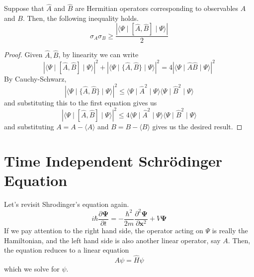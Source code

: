 \documentclass{article}
\begin{document}
    \begin{theorem}
      \label{thm:heisenberg-uncertainty-principle}
      Suppose that $\hat{A}$ and $\hat{B}$ are Hermitian operators corresponding to observables $A$ and $B$. Then, the following inequality holds. 
      \begin{equation} 
        \sigma_A \sigma_B \geq \frac{|\langle \Psi \mid [\hat{A}, \hat{B}] \mid \Psi \rangle |}{2}
      \end{equation}
    \end{theorem}
    \begin{proof} 
      Given $\hat{A}, \hat{B}$, by linearity we can write 
      \begin{equation} 
        |\langle \Psi \mid [\hat{A}, \hat{B}] \mid \Psi \rangle |^2 + | \langle \Psi \mid \{\hat{A}, \hat{B} \} \mid \Psi \rangle |^2 = 4 | \langle \Psi \mid \hat{A} \hat{B} \mid \Psi \rangle |^2
      \end{equation}
      By Cauchy-Schwarz, 
      \begin{equation} 
        | \langle \Psi \mid \{\hat{A}, \hat{B} \} \mid \Psi \rangle |^2 \leq \langle \Psi \mid \hat{A}^2 \mid \Psi \rangle \langle \Psi \mid \hat{B}^2 \mid \Psi \rangle 
      \end{equation} 
      and substituting this to the first equation gives us 
      \begin{equation} 
        |\langle \Psi \mid [\hat{A}, \hat{B}] \mid \Psi \rangle |^2 \leq 4 \langle \Psi \mid \hat{A}^2 \mid \Psi \rangle \langle \Psi \mid \hat{B}^2 \mid \Psi \rangle 
      \end{equation}
      and substituting $A = A - \langle A \rangle$ and $B = B - \langle B \rangle$ gives us the desired result. 
    \end{proof}


 
\section{Time Independent Schr\"odinger Equation}

  Let's revisit Shrodinger's equation again. 
  \begin{equation} 
    i \hbar \frac{\partial \boldsymbol{\Psi}}{\partial t} = - \frac{\hbar^2}{2m} \frac{\partial^2 \boldsymbol{\Psi}}{\partial \mathbf{x}^2} + V \boldsymbol{\Psi}
  \end{equation}
  If we pay attention to the right hand side, the operator acting on $\Psi$ is really the Hamiltonian, and the left hand side is also another linear operator, say $A$. Then, the equation reduces to a linear equation 
  \begin{equation} 
    A \psi = \hat{H} \psi
  \end{equation}
  which we solve for $\psi$. 
\end{document}
